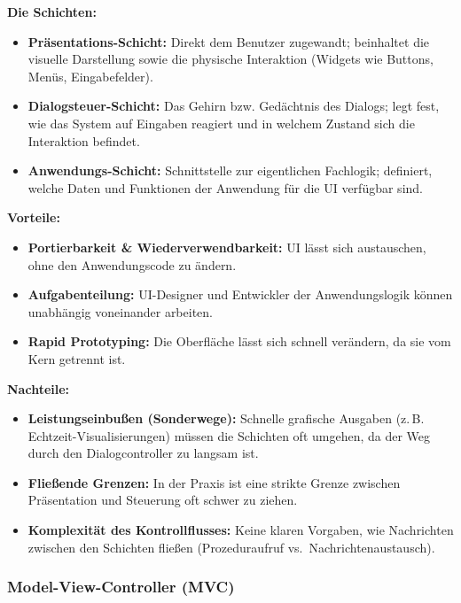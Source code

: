 \documentclass[12pt, a4paper]{article}
\begin{document}
\textbf{Die Schichten:}
\begin{itemize}
  \item \textbf{Präsentations-Schicht:} Direkt dem Benutzer zugewandt; beinhaltet
        die visuelle Darstellung sowie die physische Interaktion (Widgets wie Buttons,
        Menüs, Eingabefelder).
  \item \textbf{Dialogsteuer-Schicht:} Das \glqq{}Gehirn\grqq{} bzw. \glqq{}Gedächtnis\grqq{} des Dialogs;
        legt fest, wie das System auf Eingaben reagiert und in welchem Zustand sich
        die Interaktion befindet.
  \item \textbf{Anwendungs-Schicht:} Schnittstelle zur eigentlichen Fachlogik;
        definiert, welche Daten und Funktionen der Anwendung für die UI verfügbar sind.
\end{itemize}

\textbf{Vorteile:}
\begin{itemize}
  \item \textbf{Portierbarkeit \& Wiederverwendbarkeit:} UI lässt sich austauschen,
        ohne den Anwendungscode zu ändern.
  \item \textbf{Aufgabenteilung:} UI-Designer und Entwickler der Anwendungslogik
        können unabhängig voneinander arbeiten.
  \item \textbf{Rapid Prototyping:} Die Oberfläche lässt sich schnell verändern,
        da sie vom Kern getrennt ist.
\end{itemize}

\textbf{Nachteile:}
\begin{itemize}
  \item \textbf{Leistungseinbußen (\glqq{}Sonderwege\grqq{}):} Schnelle grafische Ausgaben
        (z.\,B. Echtzeit-Visualisierungen) müssen die Schichten oft umgehen,
        da der Weg durch den Dialogcontroller zu langsam ist.
  \item \textbf{Fließende Grenzen:} In der Praxis ist eine strikte Grenze zwischen
        Präsentation und Steuerung oft schwer zu ziehen.
  \item \textbf{Komplexität des Kontrollflusses:} Keine klaren Vorgaben, wie
        Nachrichten zwischen den Schichten fließen
        (Prozeduraufruf vs.\ Nachrichtenaustausch).
\end{itemize}

\subsubsection{Model-View-Controller (MVC)}
\end{document}
